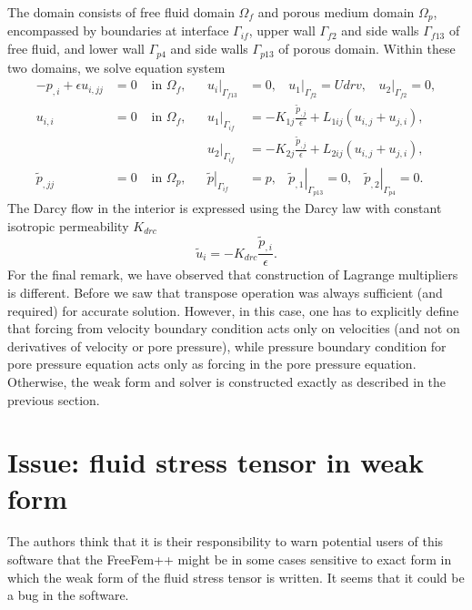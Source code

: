 \documentclass[12pt,a4paper]{article}
\newcommand{\ord}{\epsilon}
\begin{document}
The domain consists of free fluid domain $\Omega_f$ and porous medium domain $\Omega_p$, encompassed by boundaries at interface $\Gamma_{if}$, upper wall $\Gamma_{f2}$ and side walls $\Gamma_{f13}$ of free fluid, and lower wall $\Gamma_{p4}$ and side walls $\Gamma_{p13}$ of porous domain. Within these two domains, we solve equation system
\begin{align}
- p_{,i} + \ord u_{i,jj} & = 0 & \mbox{ in } \Omega_f, & & \left. u_i \right|_{\Gamma_{f13}} & = 0, \ \ \ \ \left. u_1 \right|_{\Gamma_{f2}} = Udrv, \ \ \ \ \left. u_2 \right|_{\Gamma_{f2}} = 0, \\
u_{i,i} & = 0 & \mbox{ in } \Omega_f, & & \left. u_1 \right|_{\Gamma_{if}} & = - K_{1j} \frac{\tilde{p}_{,j}}{\ord} + L_{1ij} \left( u_{i,j} + u_{j,i} \right), \\
& & & & \left. u_2 \right|_{\Gamma_{if}} & = - K_{2j} \frac{\tilde{p}_{,j}}{\ord} + L_{2ij} \left( u_{i,j} + u_{j,i} \right), \\
\tilde{p}_{,jj} & = 0 & \mbox{ in } \Omega_p, & & \left. \tilde{p} \right|_{\Gamma_{if}} & = p, \ \ \ \ \left. \tilde{p}_{,1} \right|_{\Gamma_{p13}} = 0, \ \ \ \ \left. \tilde{p}_{,2} \right|_{\Gamma_{p4}} = 0.
\end{align}
The Darcy flow in the interior is expressed using the Darcy law with constant isotropic permeability $K_{drc}$
\begin{equation}
\tilde{u}_i = - K_{drc} \frac{\tilde{p}_{,i}}{\ord} .
\end{equation}
For the final remark, we have observed that
construction of Lagrange multipliers is different. Before we saw that transpose operation was always sufficient (and required) for accurate solution. However, in this case, one has to explicitly define that forcing from velocity boundary condition acts only on velocities (and not on derivatives of velocity or pore pressure), while pressure boundary condition for pore pressure equation acts only as forcing in the pore pressure equation.
Otherwise, the weak form and solver is constructed exactly as described in the previous section.

\section{Issue: fluid stress tensor in weak form}

The authors think that it is their responsibility to warn potential users of this software
that the FreeFem++ might be in some cases sensitive to exact form in which the weak form 
of the fluid stress tensor is written. It seems that it could be a bug in the software.
\end{document}
